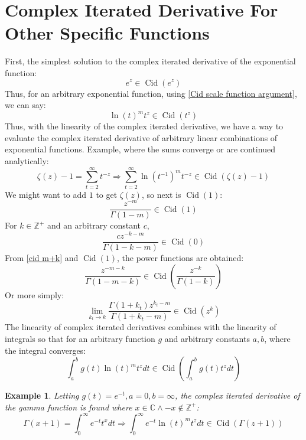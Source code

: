 \documentclass[]{article}
\DeclareMathOperator{\Cid}{Cid}
\newcommand{\pqty}[1]{{\left(#1\right)}}
\newtheorem{example}{Example}[section]
\numberwithin{equation}{section}
\begin{document}
	\section{Complex Iterated Derivative For Other Specific Functions}
	First, the simplest solution to the complex iterated derivative of the exponential function:
	\begin{equation}
		e^z\in \Cid\pqty{e^z}
	\end{equation}
	Thus, for an arbitrary exponential function, using \eqref{Cid scale function argument}, we can say:
	\begin{equation}
		\ln\pqty{t}^m t^z\in \Cid\pqty{t^z}
	\end{equation}
	Thus, with the linearity of the complex iterated derivative, we have a way to evaluate the complex iterated derivative of arbitrary linear combinations of exponential functions. Example, where the sums converge or are continued analytically:
	\begin{equation}
		\zeta\pqty{z}-1=\sum_{t=2}^{\infty}t^{-z}
		\Rightarrow
		\sum_{t=2}^{\infty}\ln\pqty{t^{-1}}^m t^{-z}\in\Cid\pqty{\zeta\pqty{z}-1}
	\end{equation}
	We might want to add $1$ to get $\zeta\pqty{z}$, so next is $\Cid\pqty{1}$:
	\begin{equation}
		\frac{z^{-m}}{\Gamma\pqty{1-m}}\in\Cid\pqty{1}
	\end{equation}
	For $k\in\mathbb{Z}^+$ and an arbitrary constant $c$,
	\begin{equation}
		\frac{cz^{-k-m}}{\Gamma\pqty{1-k-m}}\in\Cid\pqty{0}
	\end{equation}
	From \eqref{cid m+k} and $\Cid\pqty{1}$, the power functions are obtained:
	\begin{equation}
		\frac{z^{-m-k}}{\Gamma\pqty{1-m-k}}\in\Cid\pqty{\frac{z^{-k}}{\Gamma\pqty{1-k}}}
	\end{equation}
	Or more simply:
	\begin{equation}
		\lim\limits_{k_t\to k} \frac{\Gamma\pqty{1+k_t}z^{k_t-m}}{\Gamma\pqty{1+k_t-m}}\in\Cid\pqty{z^{k}}
	\end{equation}
	The linearity of complex iterated derivatives combines with the linearity of integrals so that for an arbitrary function $g$ and arbitrary constants $a,b$, where the integral converges:
	\begin{equation}
		\int_{a}^{b}g\pqty{t}\ln\pqty{t}^m t^z dt
		\in\Cid\pqty{\int_{a}^{b}g\pqty{t}t^z dt}
	\end{equation}
	
	\begin{example}
		Letting $g\pqty{t}=e^{-t},a=0,b=\infty$, the complex iterated derivative of the gamma function is found where $x\in\mathbb{C}\land -x\not\in\mathbb{Z}^+$:
		\begin{equation}
			\Gamma\pqty{x+1} = \int_{0}^{\infty}e^{-t}t^x dt
			\Rightarrow
			\int_{0}^{\infty}e^{-t}\ln\pqty{t}^m t^z dt\in\Cid\pqty{\Gamma\pqty{z+1}}
		\end{equation}
	\end{example}
\end{document}
